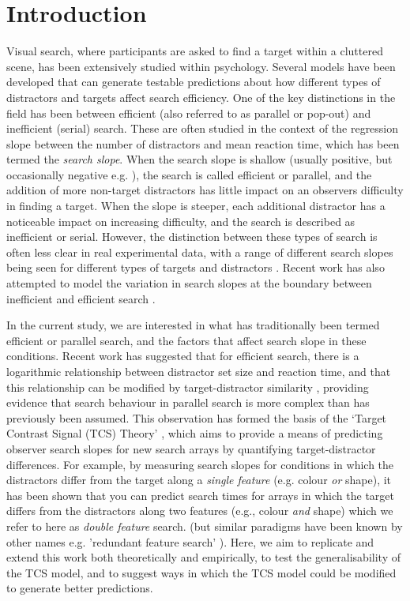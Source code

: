 \documentclass[preprint,12pt,authoryear]{elsarticle}
\begin{document}
\section{Introduction}
\label{intro}

Visual search, where participants are asked to find a target within a cluttered scene, has been extensively studied within psychology. Several models have been developed that can generate testable predictions about how different types of distractors and targets affect search efficiency. One of the key distinctions in the field has been between efficient (also referred to as parallel or pop-out) and inefficient (serial) search. These are often studied in the context of the regression slope between the number of distractors and mean reaction time, which has been termed the \textit{search slope}. When the search slope is shallow (usually positive, but occasionally negative e.g. \citep{rangelov2017failure}), the search is called efficient or parallel, and the addition of more non-target distractors has little impact on an observers difficulty in finding a target. When the slope is steeper, each additional distractor has a noticeable impact on increasing difficulty, and the search is described as inefficient or serial. However, the distinction between these types of search is often less clear in real experimental data, with a range of different search slopes being seen for different types of targets and distractors \citep{duncan1989visual,cave1990modeling,wolfe1998can,liesefeld2016search}. Recent work has also attempted to model the variation in search slopes at the boundary between inefficient and efficient search \citep{liesefeld2016search}.

In the current study, we are interested in what has traditionally been termed efficient or parallel search, and the factors that affect search slope in these conditions. Recent work has suggested that for efficient search, there is a logarithmic relationship between distractor set size and reaction time, and that this relationship can be modified by target-distractor similarity \citep{buetti2016towards}, providing evidence that search behaviour in parallel search is more complex than has previously been assumed. This observation has formed the basis of the `Target Contrast Signal (TCS) Theory' \citep{lleras2020target}, which aims to provide a means of predicting observer search slopes for new search arrays by quantifying target-distractor differences. For example, by measuring search slopes for conditions in which the distractors differ from the target along a \textit{single feature} (e.g. colour \textit{or} shape), it has been shown that you can predict search times for arrays in which the target differs from the distractors along two features (e.g., colour \textit{and} shape) which we refer to here as \textit{double feature} search. \citep{buetti2019predicting} (but similar paradigms have been known by other names e.g. 'redundant feature search' \citep{krummenacher2012dynamic, mordkoff1991interactive}). Here, we aim to replicate and extend this work both theoretically and empirically, to test the generalisability of the TCS model, and to suggest ways in which the TCS model could be modified to generate better predictions.
\end{document}
